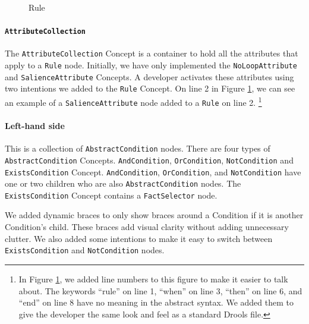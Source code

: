 \begin{figure}[H]
    \centering
    \caption{Rule}
    \label{fig:Rule}
\end{figure}

\paragraph{\texttt{AttributeCollection}} The \texttt{AttributeCollection} Concept is a container to hold all the attributes that apply to a \texttt{Rule} node.
Initially, we have only implemented the \texttt{NoLoopAttribute} and \texttt{SalienceAttribute} Concepts.
A developer activates these attributes using two intentions we added to the \texttt{Rule} Concept.
On line 2 in Figure \ref{fig:Rule}, we can see an example of a \texttt{SalienceAttribute} node added to a \texttt{Rule} on line 2.
\footnote{In Figure \ref{fig:Rule}, we added line numbers to this figure to make it easier to talk about.
The keywords ``rule'' on line 1, ``when'' on line 3, ``then'' on line 6, and ``end'' on line 8 have no meaning in the abstract syntax.
We added them to give the developer the same look and feel as a standard Drools file.}

\paragraph{Left-hand side} This is a collection of \texttt{AbstractCondition} nodes.
There are four types of \texttt{AbstractCondition} Concepts.
\texttt{AndCondition}, \texttt{OrCondition}, \texttt{NotCondition} and \texttt{ExistsCondition} Concept.
\texttt{AndCondition}, \texttt{OrCondition}, and \texttt{NotCondition} have one or two children who are also \texttt{AbstractCondition} nodes.
The \texttt{ExistsCondition} Concept contains a \texttt{FactSelector} node.

We added dynamic braces to only show braces around a Condition if it is another Condition's child. 
These braces add visual clarity without adding unnecessary clutter.
We also added some intentions to make it easy to switch between \texttt{ExistsCondition} and \texttt{NotCondition} nodes.

